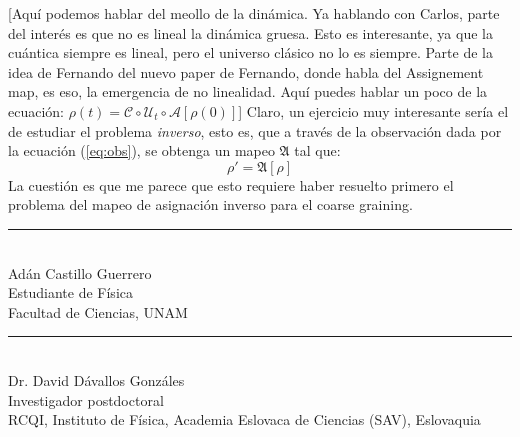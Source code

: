 \documentclass[onecolumn,11pt]{article}
\newcommand{\mcU}{\mathcal{U}}
\newcommand{\mcC}{\mathcal{C}}
\newcommand{\mcA}{\mathcal{A}}
\newcommand{\nota}[1]{{\color{red} [#1]}}
\begin{document}
\nota{Aquí podemos hablar del meollo de la dinámica. Ya hablando con Carlos, parte del interés es que no es lineal la dinámica gruesa. Esto es interesante, ya que la cuántica siempre es lineal, pero el universo clásico no lo es siempre. Parte de la idea de Fernando del nuevo paper de Fernando, donde habla del Assignement map, es eso, la emergencia de no linealidad. Aquí puedes hablar un poco de la ecuación: $\rho(t)=\mcC \circ \mcU_t \circ \mcA [\rho(0)]$} Claro, un ejercicio muy interesante sería el de estudiar el problema \textit{inverso}, esto es, que a través de la observación dada por la ecuación (\ref{eq:obs}), se obtenga un mapeo $\mathfrak{A}$ tal que:
\begin{equation}
    \rho'=\mathfrak{A}\left[\rho\right]
\end{equation}
La cuestión es que me parece que esto requiere haber resuelto primero el problema del mapeo de asignación inverso para el coarse graining.


\begin{center}
    \rule{200pt}{0.4pt}\\
    Adán Castillo Guerrero \\
    Estudiante de Física \\
    Facultad de Ciencias, UNAM \\
    
\end{center}

\vspace{1.0cm}

\begin{center}
    \rule{200pt}{0.4pt}\\
    Dr. David Dávallos Gonzáles \\
    Investigador postdoctoral \\
    RCQI, Instituto de Física, Academia Eslovaca de Ciencias (SAV), Eslovaquia\\
    
\end{center}


\end{document}
